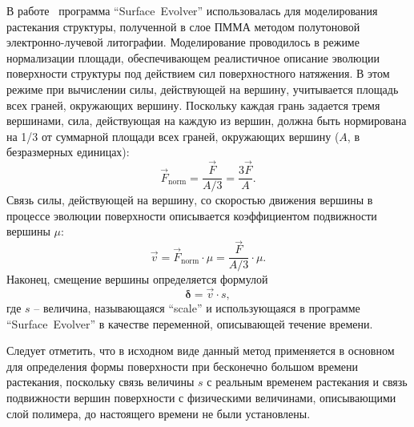 В работе~\cite{Kirchner_reflow} программа ``Surface~Evolver'' использовалась для моделирования растекания структуры, полученной в слое ПММА методом полутоновой электронно-лучевой литографии.
Моделирование проводилось в режиме нормализации площади, обеспечивающем реалистичное описание эволюции поверхности структуры под действием сил поверхностного натяжения.
В этом режиме при вычислении силы, действующей на вершину, учитывается площадь всех граней, окружающих вершину. Поскольку каждая грань задается тремя вершинами,
сила, действующая на каждую из вершин, должна быть нормирована на 1/3 от суммарной площади всех граней, окружающих вершину ($A$, в безразмерных единицах):
\begin{equation}
	\vec{F}_\mathrm{norm} = \frac{\vec{F}}{A/3} = \frac{3\vec{F}}{A}.
\end{equation}
Связь силы, действующей на вершину, со скоростью движения вершины в процессе эволюции поверхности описывается коэффициентом подвижности вершины $\mu$:
\begin{equation} \label{eq:SE_v}
	\vec{v} = \vec{F}_\mathrm{norm} \cdot \mu = \frac{\vec{F}}{A/3} \cdot \mu.
\end{equation}
Наконец, смещение вершины определяется формулой
\begin{equation} \label{eq:SE_delta}
	\boldsymbol{\delta} = \vec{v} \cdot s,
\end{equation}
где $s$ -- величина, называющаяся ``scale'' и использующаяся в программе ``Surface~Evolver'' в качестве переменной, описывающей течение времени.

Следует отметить, что в исходном виде данный метод применяется в основном для определения формы поверхности при бесконечно большом времени растекания, поскольку связь величины $s$ с реальным временем растекания и связь подвижности вершин поверхности с физическими величинами, описывающими слой полимера, до настоящего времени не были установлены.
